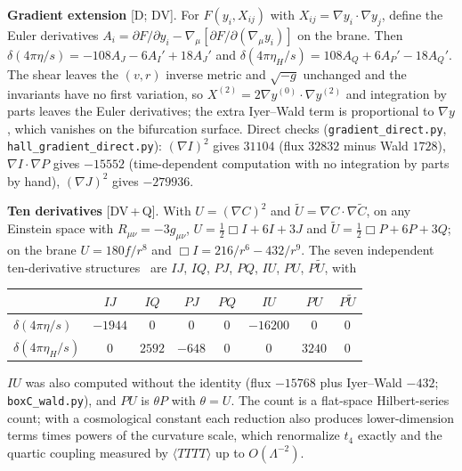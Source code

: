 \textbf{Gradient extension} [D; DV]. For $F(y_i,X_{ij})$ with $X_{ij}=\nabla y_i\cdot\nabla y_j$, define the Euler derivatives
$A_i=\partial F/\partial y_i-\nabla_\mu[\partial F/\partial(\nabla_\mu y_i)]$ on the brane. Then
$\delta(4\pi\eta/s)=-108A_J-6A_I'+18A_J'$ and $\delta(4\pi\eta_H/s)=108A_Q+6A_P'-18A_Q'$. The shear leaves the $(v,r)$
inverse metric and $\sqrt{-g}$ unchanged and the invariants have no first variation, so $X^{(2)}=2\nabla y^{(0)}\cdot\nabla y^{(2)}$
and integration by parts leaves the Euler derivatives; the extra Iyer--Wald term is proportional to $\nabla y$, which vanishes on
the bifurcation surface. Direct checks (\texttt{gradient\_direct.py}, \texttt{hall\_gradient\_direct.py}): $(\nabla I)^2$ gives
$31104$ (flux $32832$ minus Wald $1728$), $\nabla I\cdot\nabla P$ gives $-15552$ (time-dependent computation with no integration
by parts by hand), $(\nabla J)^2$ gives $-279936$.

\textbf{Ten derivatives} [DV\,+\,Q]. With $U=(\nabla C)^2$ and $\tilde U=\nabla C\cdot\nabla\tilde C$, on any Einstein space with
$R_{\mu\nu}=-3g_{\mu\nu}$, $U=\tfrac12\Box I+6I+3J$ and $\tilde U=\tfrac12\Box P+6P+3Q$; on the brane $U=180f/r^8$ and
$\Box I=216/r^6-432/r^9$. The seven independent ten-derivative structures~\cite{Ruhdorfer:2019qmk} are $IJ$, $IQ$, $PJ$, $PQ$,
$IU$, $PU$, $P\tilde U$, with
\begin{center}
\begin{tabular}{lccccccc}
& $IJ$ & $IQ$ & $PJ$ & $PQ$ & $IU$ & $PU$ & $P\tilde U$\\\hline
$\delta(4\pi\eta/s)$ & $-1944$ & $0$ & $0$ & $0$ & $-16200$ & $0$ & $0$\\
$\delta(4\pi\eta_H/s)$ & $0$ & $2592$ & $-648$ & $0$ & $0$ & $3240$ & $0$
\end{tabular}
\end{center}
$IU$ was also computed without the identity (flux $-15768$ plus Iyer--Wald $-432$; \texttt{boxC\_wald.py}), and $PU$ is $\theta P$
with $\theta=U$. The count is a flat-space Hilbert-series count; with a cosmological constant each reduction also produces
lower-dimension terms times powers of the curvature scale, which renormalize $t_4$ exactly and the quartic coupling measured by
$\langle TTTT\rangle$ up to $O(\Lambda^{-2})$.


